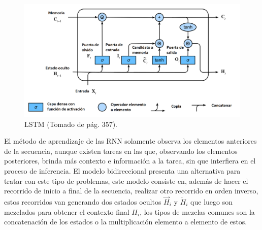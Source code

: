 \begin{figure}[h!]
	\begin{center}
		\begin{center}
			\includegraphics[scale=.3]{Graphics/rnn_lstm.png}
        \end{center}
	    \caption{LSTM (Tomado de \textcite{d2l} pág. 357).}\label{fig:rnn_lstm}
	\end{center}
\end{figure}

El método de aprendizaje de las RNN solamente observa los elementos anteriores de la secuencia, aunque existen
tareas en las que, observando los elementos posteriores, brinda más contexto e información a la tarea, sin que interfiera
en el proceso de inferencia. El modelo bidireccional presenta una alternativa para tratar con este tipo de problemas, 
este modelo consiste en, además de hacer el recorrido de inicio a final de la secuencia, realizar otro recorrido en orden 
inverso, estos recorridos van generando dos estados ocultos $\overrightarrow{H}_{i}$ y $\overleftarrow{H}_{i}$
que luego son mezclados para obtener el contexto final $H_i$, los tipos de mezclas comunes son la concatenación de los 
estados o la multiplicación elemento a elemento de estos.

